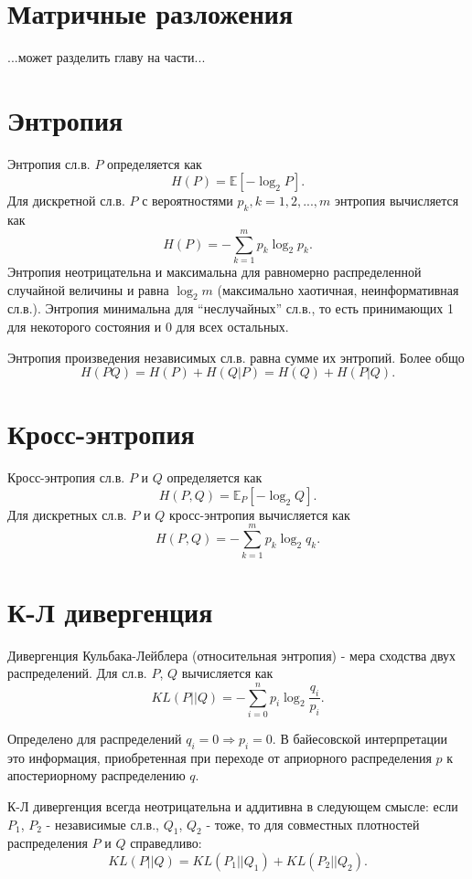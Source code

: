 \section{Матричные разложения}

...может разделить главу на части...


\section{Энтропия}

Энтропия сл.в. $P$ определяется как
$$
H(P) = \mathbb{E}[-\log_2P].
$$
Для дискретной сл.в. $P$ с вероятностями $p_k, k=1, 2, ..., m$ энтропия вычисляется как
$$
H(P) = -\sum_{k=1}^mp_k\log_2p_k.
$$
Энтропия неотрицательна и максимальна для равномерно распределенной случайной величины и равна $\log_2m$ (максимально хаотичная, неинформативная сл.в.). Энтропия минимальна для ``неслучайных'' сл.в., то есть принимающих 1 для некоторого состояния и 0 для всех остальных.

Энтропия произведения независимых сл.в. равна сумме их энтропий. Более общо
$$
H(PQ) = H(P) + H(Q|P) = H(Q) + H(P|Q).
$$


\section{Кросс-энтропия}

Кросс-энтропия сл.в. $P$ и $Q$ определяется как
$$
H(P, Q) = \mathbb{E}_P[-\log_2Q].
$$
Для дискретных сл.в. $P$ и $Q$ кросс-энтропия вычисляется как
$$
H(P, Q) = -\sum_{k=1}^mp_k\log_2q_k.
$$


\section{К-Л дивергенция}

Дивергенция Кульбака-Лейблера (относительная энтропия) - мера сходства двух распределений. Для сл.в. $P$, $Q$ вычисляется как
$$
KL(P||Q) = -\sum_{i=0}^np_i\log_2\frac{q_i}{p_i}.
$$

Определено для распределений $q_i = 0 \Rightarrow p_i=0$.
В байесовской интерпретации это информация, приобретенная при переходе от априорного распределения $p$ к апостериорному распределению $q$.

К-Л дивергенция всегда неотрицательна и аддитивна в следующем смысле: если $P_1$, $P_2$ - независимые сл.в., $Q_1$, $Q_2$ - тоже, то для совместных плотностей распределения $P$ и $Q$ справедливо:
$$
KL(P||Q) =  KL(P_1||Q_1) + KL(P_2||Q_2).
$$

